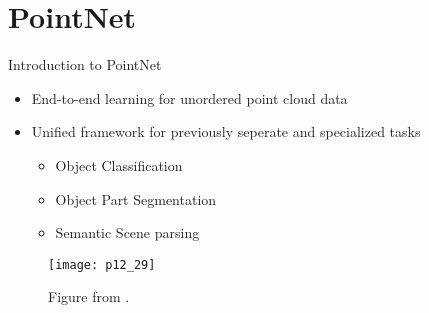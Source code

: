 \section{PointNet}

\begin{frame}[c]{Introduction to PointNet}
    \large
    \begin{multicols}{2}
        \begin{itemize}
            \item End-to-end learning for unordered point cloud data
            \item Unified framework for previously seperate and specialized tasks
                \begin{itemize}
                    \item Object Classification
                    \item Object Part Segmentation
                    \item Semantic Scene parsing
                \end{itemize}
        \end{itemize}
        \begin{figure}
            \texttt{[image: p12\_29]}
            \caption{Figure from \cite{qi2017pointnet}.}
        \end{figure}
    \end{multicols}
\end{frame}


